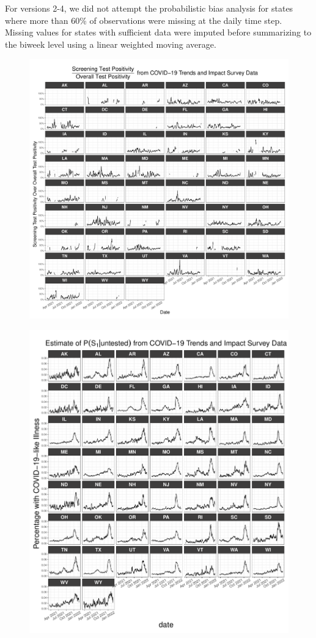 \documentclass[12pt,twoside]{smiththesis}
\begin{document}
For versions 2-4, we did not attempt the probabilistic bias analysis for states where more than 60\% of observations were missing at the daily time step. Missing values for states with sufficient data were imputed before summarizing to the biweek level using a linear weighted moving average.
\begin{figure}
\includegraphics[width=0.9\linewidth]{figure/ctis_beta_states} \caption{\label{fig:statectis}}\label{fig:unnamed-chunk-2}
\end{figure}
\begin{figure}
\includegraphics[width=0.9\linewidth]{figure/ctis_s_untested_states} \caption{\label{fig:statectis-s-untested}}\label{fig:unnamed-chunk-3}
\end{figure}
\end{document}
